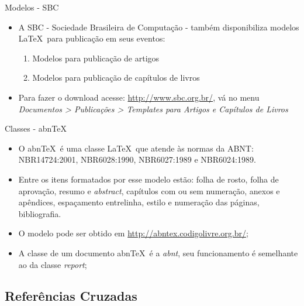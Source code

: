 \begin{frame}{Modelos - SBC}
    
    \begin{itemize}
    \item A SBC - Sociedade Brasileira de Computação - também disponibiliza modelos \LaTeX\ para publicação em seus eventos:
        \begin{enumerate}
        \item Modelos para publicação de artigos
        \item Modelos para publicação de capítulos de livros
        \end{enumerate}
    \item Para fazer o download acesse: \url{http://www.sbc.org.br/}, vá no menu \textit{Documentos > Publicações > Templates para Artigos e Capítulos de Livros}
    \end{itemize}

\end{frame}

\begin{frame}{Classes - abn\TeX}

    \begin{itemize}
    \item O abn\TeX\ é uma classe \LaTeX\ que atende às normas da ABNT: NBR14724:2001, NBR6028:1990, NBR6027:1989 e NBR6024:1989.
    \item Entre os itens formatados por esse modelo estão: folha de rosto, folha de aprovação, resumo e \textit{abstract}, capítulos com ou sem numeração, anexos e apêndices, espaçamento entrelinha, estilo e numeração das páginas, bibliografia.
    \item O modelo pode ser obtido em \url{http://abntex.codigolivre.org.br/};
    \item A classe de um documento abn\TeX\ é a \textit{abnt}, seu funcionamento é semelhante ao da classe \textit{report};
    \end{itemize}

\end{frame}

\subsection{Referências Cruzadas}

